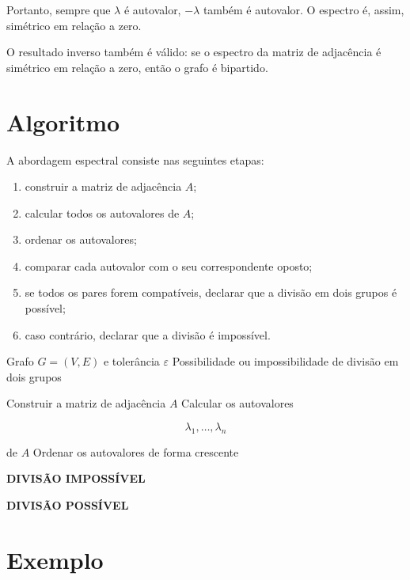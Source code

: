 \documentclass[12pt,a4paper]{article}
\begin{document}
Portanto, sempre que $\lambda$ é autovalor, $-\lambda$ também é
autovalor. O espectro é, assim, simétrico em relação a zero.

O resultado inverso também é válido: se o espectro da matriz de
adjacência é simétrico em relação a zero, então o grafo é bipartido.

\section{Algoritmo}

A abordagem espectral consiste nas seguintes etapas:

\begin{enumerate}
\item construir a matriz de adjacência $A$;
\item calcular todos os autovalores de $A$;
\item ordenar os autovalores;
\item comparar cada autovalor com o seu correspondente oposto;
\item se todos os pares forem compatíveis, declarar que a divisão
em dois grupos é possível;
\item caso contrário, declarar que a divisão é impossível.
\end{enumerate}

\begin{algorithm}
\caption{Verificação espectral de bipartição}
\begin{algorithmic}[1]

\Require Grafo $G=(V,E)$ e tolerância $\varepsilon$
\Ensure Possibilidade ou impossibilidade de divisão em dois grupos

\State Construir a matriz de adjacência $A$
\State Calcular os autovalores

$$
\lambda_1,\ldots,\lambda_n
$$

de $A$
\State Ordenar os autovalores de forma crescente

\State \Return \textbf{DIVISÃO IMPOSSÍVEL}
\EndIf
\EndFor

\State \Return \textbf{DIVISÃO POSSÍVEL}

\end{algorithmic}
\end{algorithm}

\section{Exemplo}
\end{document}
